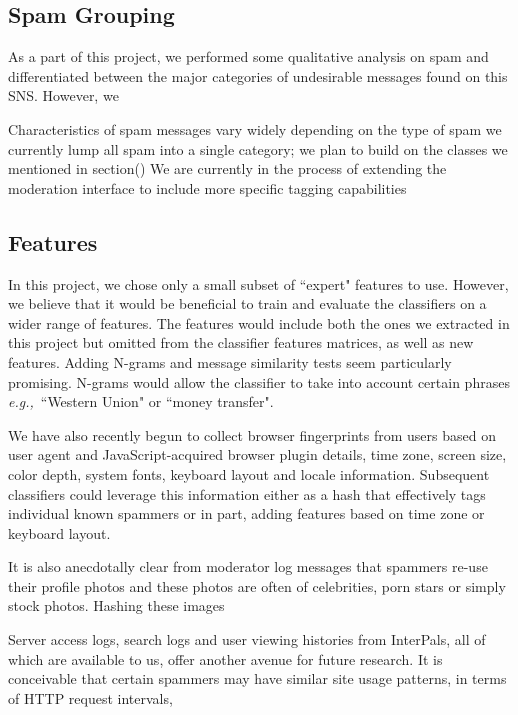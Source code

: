 \documentclass[preprint]{acm_proc_article-sp}
\newcommand{\eg}{{\em e.g.,}~}
\begin{document}
\subsection{Spam Grouping}

As a part of this project, we performed some qualitative analysis on spam and differentiated between the major categories of undesirable messages found on this SNS. However, we 

Characteristics of spam messages vary widely depending on the type of spam
we currently lump all spam into a single category; we plan to build on the classes we mentioned in section()
We are currently in the process of extending the moderation interface to include more specific tagging capabilities


\subsection{Features}

In this project, we chose only a small subset of ``expert" features to use. However, we believe that it would be beneficial to train and evaluate the classifiers on a wider range of features. The features would include both the ones we extracted in this project but omitted from the classifier features matrices, as well as new features. Adding N-grams and message similarity tests seem particularly promising. N-grams would allow the classifier to take into account certain phrases \eg{``Western Union" or ``money transfer"}. 

We have also recently begun to collect browser fingerprints from users based on user agent and JavaScript-acquired browser plugin details, time zone, screen size, color depth, system fonts, keyboard layout and locale information. Subsequent classifiers could leverage this information either as a hash that effectively tags individual known spammers or in part, adding features based on time zone or keyboard layout.

It is also anecdotally clear from moderator log messages that spammers re-use their profile photos and these photos are often of celebrities, porn stars or simply stock photos. Hashing these images 


Server access logs, search logs and user viewing histories from InterPals, all of which are available to us, offer another avenue for future research. It is conceivable that certain spammers may have similar site usage patterns, in terms of HTTP request intervals, 
\end{document}

